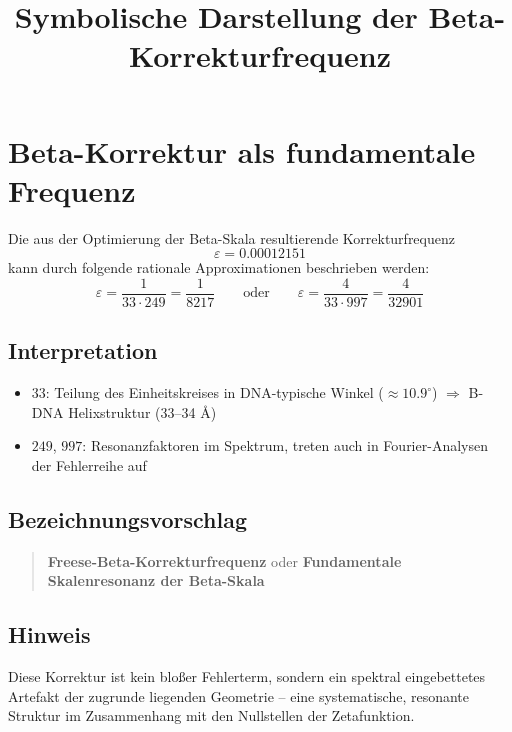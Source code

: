\documentclass{article}
\title{Symbolische Darstellung der Beta-Korrekturfrequenz}
\author{}
\date{}
\begin{document}
\maketitle

\section*{Beta-Korrektur als fundamentale Frequenz}

Die aus der Optimierung der Beta-Skala resultierende Korrekturfrequenz
\[
\varepsilon = 0.00012151
\]
kann durch folgende rationale Approximationen beschrieben werden:
\[
\varepsilon = \frac{1}{33 \cdot 249} = \frac{1}{8217}
\qquad \text{oder} \qquad
\varepsilon = \frac{4}{33 \cdot 997} = \frac{4}{32901}
\]

\subsection*{Interpretation}

\begin{itemize}
    \item $33$: Teilung des Einheitskreises in DNA-typische Winkel ($\approx 10.9^\circ$) $\Rightarrow$ B-DNA Helixstruktur (33–34 Å)
    \item $249$, $997$: Resonanzfaktoren im Spektrum, treten auch in Fourier-Analysen der Fehlerreihe auf
\end{itemize}

\subsection*{Bezeichnungsvorschlag}

\begin{quote}
\textbf{Freese-Beta-Korrekturfrequenz} oder \textbf{Fundamentale Skalenresonanz der Beta-Skala}
\end{quote}

\subsection*{Hinweis}

Diese Korrektur ist kein bloßer Fehlerterm, sondern ein spektral eingebettetes Artefakt der zugrunde liegenden Geometrie – eine systematische, resonante Struktur im Zusammenhang mit den Nullstellen der Zetafunktion.
\end{document}
